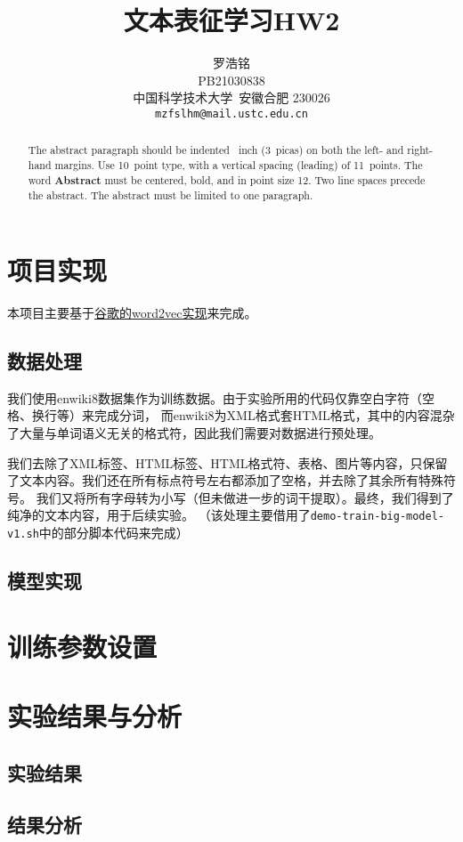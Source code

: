 \documentclass{article}
\title{文本表征学习HW2}
\author{
  罗浩铭 \\
  PB21030838\\
  中国科学技术大学\ 安徽合肥 230026 \\
  \texttt{mzfslhm@mail.ustc.edu.cn} \\
}
\begin{document}
\maketitle


\begin{abstract}
  The abstract paragraph should be indented ~inch (3~picas) on
  both the left- and right-hand margins. Use 10~point type, with a vertical
  spacing (leading) of 11~points.  The word \textbf{Abstract} must be centered,
  bold, and in point size 12. Two line spaces precede the abstract. The abstract
  must be limited to one paragraph.
\end{abstract}

\section{项目实现}

本项目主要基于\href{https://code.google.com/archive/p/word2vec/source/default/source}{谷歌的word2vec实现}来完成。

\subsection{数据处理}

我们使用enwiki8数据集作为训练数据。由于实验所用的代码仅靠空白字符（空格、换行等）来完成分词，
而enwiki8为XML格式套HTML格式，其中的内容混杂了大量与单词语义无关的格式符，因此我们需要对数据进行预处理。

我们去除了XML标签、HTML标签、HTML格式符、表格、图片等内容，只保留了文本内容。我们还在所有标点符号左右都添加了空格，并去除了其余所有特殊符号。
我们又将所有字母转为小写（但未做进一步的词干提取）。最终，我们得到了纯净的文本内容，用于后续实验。
（该处理主要借用了\texttt{demo-train-big-model-v1.sh}中的部分脚本代码来完成）


\subsection{模型实现}


\section{训练参数设置}


\section{实验结果与分析}

\subsection{实验结果}

\subsection{结果分析}
\end{document}

